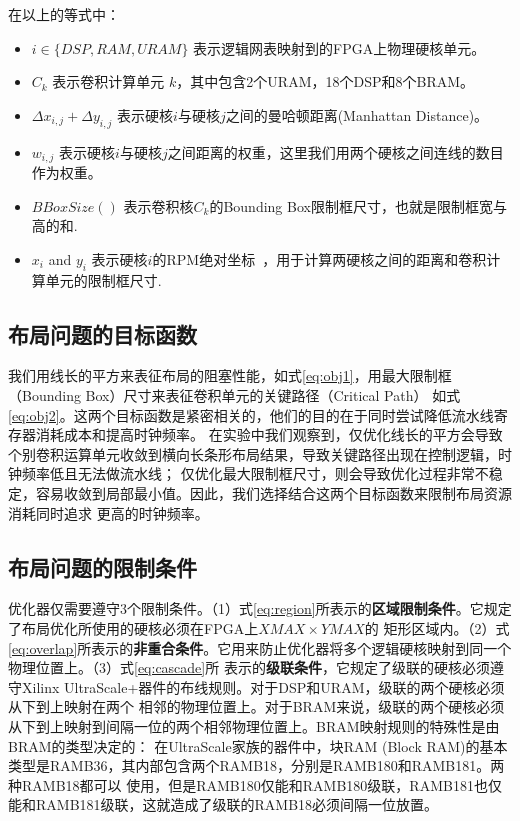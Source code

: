 在以上的等式中：
\begin{itemize}
	\item $i \in \{ DSP, RAM, URAM \} $ 表示逻辑网表映射到的FPGA上物理硬核单元。
	\item $C_k$ 表示卷积计算单元 $k$，其中包含2个URAM，18个DSP和8个BRAM。 
	\item $\Delta{x_{i,j}} + \Delta{y_{i,j}}$ 表示硬核$i$与硬核$j$之间的曼哈顿距离(Manhattan Distance)。
	\item $w_{i,j}$ 表示硬核$i$与硬核$j$之间距离的权重，这里我们用两个硬核之间连线的数目作为权重。
	\item $BBoxSize()$ 表示卷积核$C_k$的Bounding Box限制框尺寸，也就是限制框宽与高的和. 
	\item $x_i$ and $y_i$ 表示硬核$i$的RPM绝对坐标~\cite{ug903}，用于计算两硬核之间的距离和卷积计算单元的限制框尺寸.
\end{itemize}

\subsection{布局问题的目标函数}
我们用线长的平方来表征布局的阻塞性能，如式\ref{eq:obj1}，用最大限制框（Bounding Box）尺寸来表征卷积单元的关键路径（Critical Path）
如式\ref{eq:obj2}。这两个目标函数是紧密相关的，他们的目的在于同时尝试降低流水线寄存器消耗成本和提高时钟频率。
在实验中我们观察到，仅优化线长的平方会导致个别卷积运算单元收敛到横向长条形布局结果，导致关键路径出现在控制逻辑，时钟频率低且无法做流水线；
仅优化最大限制框尺寸，则会导致优化过程非常不稳定，容易收敛到局部最小值。因此，我们选择结合这两个目标函数来限制布局资源消耗同时追求
更高的时钟频率。

\subsection{布局问题的限制条件}
优化器仅需要遵守3个限制条件。（1）式\ref{eq:region}所表示的{\bf 区域限制条件}。它规定了布局优化所使用的硬核必须在FPGA上$XMAX \times YMAX$的
矩形区域内。（2）式\ref{eq:overlap}所表示的{\bf 非重合条件}。它用来防止优化器将多个逻辑硬核映射到同一个物理位置上。（3）式\ref{eq:cascade}所
表示的{\bf 级联条件}，它规定了级联的硬核必须遵守Xilinx UltraScale+器件的布线规则。对于DSP和URAM，级联的两个硬核必须从下到上映射在两个
相邻的物理位置上。对于BRAM来说，级联的两个硬核必须从下到上映射到间隔一位的两个相邻物理位置上。BRAM映射规则的特殊性是由BRAM的类型决定的：
在UltraScale家族的器件中，块RAM (Block RAM)的基本类型是RAMB36，其内部包含两个RAMB18，分别是RAMB180和RAMB181。两种RAMB18都可以
使用，但是RAMB180仅能和RAMB180级联，RAMB181也仅能和RAMB181级联，这就造成了级联的RAMB18必须间隔一位放置。


